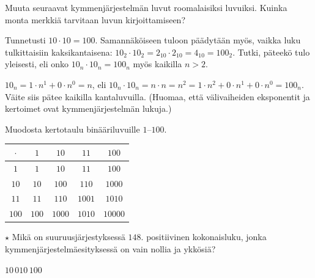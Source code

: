 \begin{tehtavasivu}
\begin{tehtava}
Muuta seuraavat kymmenjärjestelmän luvut roomalaisiksi luvuiksi. Kuinka monta merkkiä tarvitaan luvun kirjoittamiseen?
\begin{vastaus}
\end{vastaus}
\end{tehtava}

\begin{tehtava}
Tunnetusti $10\cdot 10=100$. Samannäköiseen tuloon päädytään myös, vaikka luku tulkittaisiin kaksikantaisena: $10_2 \cdot 10_2 = 2_{10}\cdot 2_{10}=4_{10}=100_2$. Tutki, päteekö tulo yleisesti, eli onko $10_n\cdot 10_n = 100_n$ myös kaikilla $n >2$.
	\begin{vastaus}
$10_n=1\cdot n^1+0\cdot n^0=n$, eli $10_n \cdot 10_n =n\cdot n = n^2= 1\cdot n^2 + 0 \cdot n^1 + 0\cdot n^0 =100_n$. Väite siis pätee kaikilla kantaluvuilla. (Huomaa, että välivaiheiden eksponentit ja kertoimet ovat kymmenjärjestelmän lukuja.)
	\end{vastaus}
\end{tehtava}

\begin{tehtava}
Muodosta kertotaulu binääriluvuille $1$--$100$.
	\begin{vastaus}
\begin{tabular}{|c||c|c|c|c|}
	\hline 
	$\cdot$ & $1$ & $10$ & $11$ & $100$ \\
	\hline
	\hline
	$1$ & $1$ & $10$ & $11$ & $100$ \\
	\hline 
	$10$ & $10$ & $100$ & $110$ & $1000$  \\
	\hline 
	$11$ & $11$ & $110$ & $1001$ & $1010$ \\
	\hline 
	$100$ & $100$ & $1000$ & $1010$ & $10000$ \\
	\hline 
	\end{tabular} 	
	\end{vastaus}
\end{tehtava}

\begin{tehtava}
	$\star$ Mikä on suuruusjärjestyksessä $148$. positiivinen kokonaisluku, jonka kymmenjärjestelmäesityksessä on vain nollia ja ykkösiä?
	\begin{vastaus}
		$10\,010\,100$
	\end{vastaus}
\end{tehtava}

%

\end{tehtavasivu}
